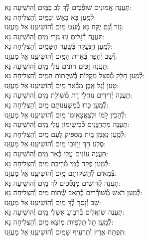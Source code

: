 \documentclass[twoside, openany, parskip=half, 11pt]{book}
\begin{document}
\begin{small}
תַּעֲנֶה אֱמוּנִים שׁוֹפְ֯כִים לְ֯ךָ לֵב כַּמַּֽיִם \hfill וְ֯הוֹשִֽׁיעָה נָּא:\\
לְ֯מַֽעַן בָּא בָאֵשׁ וּבַמַּֽיִם \hfill וְ֯הַצְלִיחָה נָא: \\
גָּזַר וְ֯נָם יֻקַּח נָא מְ֯עַט מַֽיִם \hfill וְ֯הוֹשִׁיעֵֽנוּ אֵל מָעֻזֵּֽנוּ:\\
תַּעֲנֶה דְ֯גָלִים גָּֽזוּ גִּזְרֵי מַֽיִם \hfill וְ֯הוֹשִֽׁיעָה נָּא:\\
לְ֯מַֽעַן הַנֶּעֱקַד בְּ֯שַֽׁעַר הַשָּׁמַֽיִם \hfill וְ֯הַצְלִיחָה נָא:\\
וְ֯שָׁב וְ֯חָפַר בְּ֯אֵרֹת הַמַּֽיִם \hfill וְ֯הוֹשִׁיעֵֽנוּ אֵל מָעֻזֵּֽנוּ:\\
תַּעֲנֶה זַכִּים חוֹנִים עֲלֵי מַֽיִם \hfill וְ֯הוֹשִֽׁיעָה נָּא:\\
לְ֯מַֽעַן חָלָק מְ֯פַצֵּל מַקְלוֹת בְּ֯שִׁקֲתוֹת הַמַּֽיִם \hfill וְ֯הַצְלִיחָה נָא:\\
טָעַן וְ֯גָל אֶֽבֶן מִבְּ֯אֵר מַֽיִם \hfill וְ֯הוֹשִׁיעֵֽנוּ אֵל מָעֻזֵּֽנוּ:\\
תַּעֲנֶה יְ֯דִידִים נוֹחֲלֵי דָת מְ֯שֽׁוּלַת מַֽיִם \hfill וְ֯הוֹשִֽׁיעָה נָּא: \\
לְ֯מַֽעַן כָּרוּ בְּ֯מִשְׁעֲנוֹתָם מַֽיִם \hfill וְ֯הַצְלִיחָה נָא:\\
לְ֯הָכִין לָֽמוֹ וּלְצֶאֱצָאֵֽימוֹ מַֽיִם \hfill וְ֯הוֹשִׁיעֵֽנוּ אֵל מָעֻזֵּֽנוּ:\\
תַּעֲנֶה מִתְחַנֲּנִים כְּ֯בִישִׁימוֹן עֲלֵי מַֽיִם \hfill וְ֯הוֹשִֽׁיעָה נָּא:\\
לְ֯מַֽעַן נֶאֱמַן בַּֽיִת מַסְפִּיק לָעָם מַֽיִם \hfill וְ֯הַצְלִיחָה נָא:\\
סֶלַע הָךְ וַיָזֽוּבוּ מַֽיִם \hfill וְ֯הוֹשִׁיעֵֽנוּ אֵל מָעֻזֵּֽנוּ: \\
תַּעֲנֶה עוֹנִים עֲלִי בְ֯אֵר מַֽיִם \hfill וְ֯הוֹשִֽׁיעָה נָּא: \\
לְ֯מַֽעַן פֻּקַּד בְּ֯מֵי מְ֯רִֽיבַת מַֽיִם \hfill וְ֯הַצְלִיחָה נָא:\\
צְ֯מֵאִים לְ֯הַשְׁקוֹתָם מַֽיִם \hfill וְ֯הוֹשִׁיעֵֽנוּ אֵל מָעֻזֵּנוּ: \\
תַּעֲנֶה קְ֯דוֹשִׁים מְ֯נַסְּ֯כִים לְ֯ךָ מַֽיִם \hfill וְ֯הוֹשִֽׁיעָה נָּא: \\
לְ֯מַֽעַן רֹאשׁ מְ֯שׁוֹרְ֯רִים כְּ֯תָאַב שְׁ֯תוֹת מַֽיִם \hfill וְ֯הַצְלִיחָה נָא:\\
שָׁב וְ֯נָסַךְ לְ֯ךָ מַֽיִם \hfill וְ֯הוֹשִׁיעֵֽנוּ אֵל מָעֻזֵּֽנוּ:\\
תַּעֲנֶה שׁוֹאֲלִים בְּ֯רִבּֽוּעַ אֶשְׁלֵי מַֽיִם \hfill וְ֯הוֹשִֽׁיעָה נָּא: \\
לְ֯מַֽעַן תֵּל תַּלְפִּיוֹת מֽוֹצָא מַֽיִם \hfill וְ֯הַצְלִיחָה נָא:\\
תִּפְתַּח אֶֽרֶץ וְ֯תַרְעִיף שָׁמַֽיִם \hfill וְ֯הוֹשִׁיעֵֽנוּ אֵל מָעֻזֵּֽנוּ:

\end{small}
\end{document}
